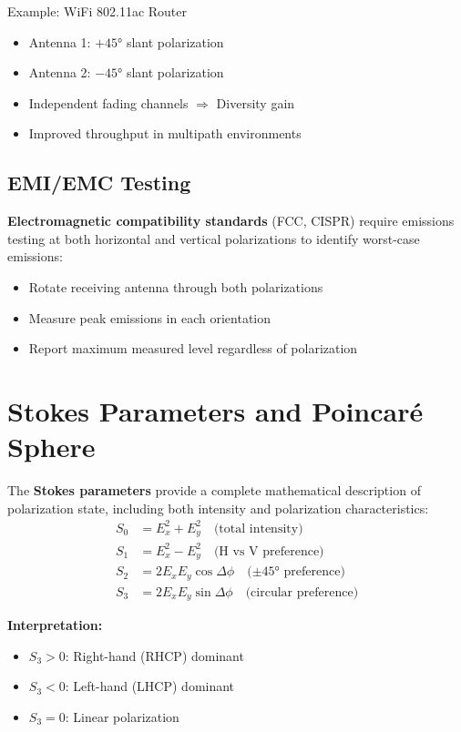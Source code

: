 \begin{calloutbox}{Example: WiFi 802.11ac Router}
\begin{itemize}
\item Antenna 1: $+45°$ slant polarization
\item Antenna 2: $-45°$ slant polarization
\item Independent fading channels $\Rightarrow$ Diversity gain
\item Improved throughput in multipath environments
\end{itemize}
\end{calloutbox}

\subsection{EMI/EMC Testing}

\textbf{Electromagnetic compatibility standards} (FCC, CISPR) require emissions testing at both horizontal and vertical polarizations to identify worst-case emissions:
\begin{itemize}
\item Rotate receiving antenna through both polarizations
\item Measure peak emissions in each orientation
\item Report maximum measured level regardless of polarization
\end{itemize}

\section{Stokes Parameters and Poincaré Sphere}

The \textbf{Stokes parameters} provide a complete mathematical description of polarization state, including both intensity and polarization characteristics:
\begin{align}
S_0 &= E_x^2 + E_y^2 \quad \text{(total intensity)} \label{eq:stokes-s0} \\
S_1 &= E_x^2 - E_y^2 \quad \text{(H vs V preference)} \label{eq:stokes-s1} \\
S_2 &= 2E_xE_y\cos\Delta\phi \quad \text{($\pm 45°$ preference)} \label{eq:stokes-s2} \\
S_3 &= 2E_xE_y\sin\Delta\phi \quad \text{(circular preference)} \label{eq:stokes-s3}
\end{align}

\textbf{Interpretation:}
\begin{itemize}
\item $S_3 > 0$: Right-hand (RHCP) dominant
\item $S_3 < 0$: Left-hand (LHCP) dominant
\item $S_3 = 0$: Linear polarization
\end{itemize}

